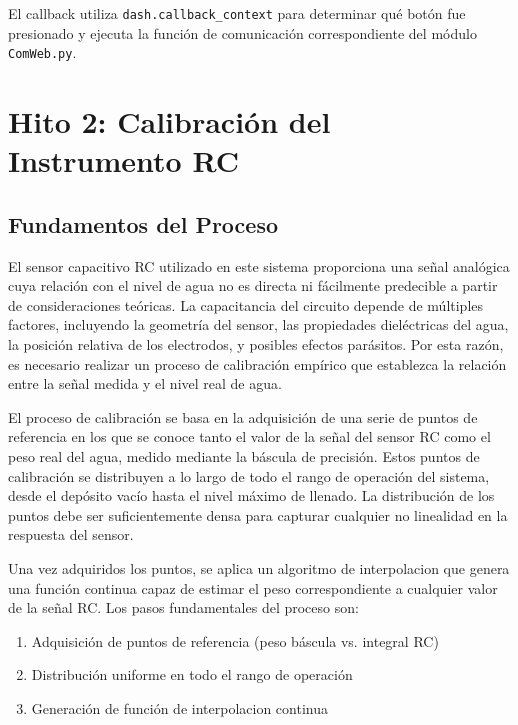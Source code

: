\documentclass[12pt,a4paper]{article}
\begin{document}
El callback utiliza \texttt{dash.callback\_context} para determinar qué botón fue presionado y ejecuta la función de comunicación correspondiente del módulo \texttt{ComWeb.py}.

\section{Hito 2: Calibración del Instrumento RC}

\subsection{Fundamentos del Proceso}

El sensor capacitivo RC utilizado en este sistema proporciona una señal analógica cuya relación con el nivel de agua no es directa ni fácilmente predecible a partir de consideraciones teóricas. La capacitancia del circuito depende de múltiples factores, incluyendo la geometría del sensor, las propiedades dieléctricas del agua, la posición relativa de los electrodos, y posibles efectos parásitos. Por esta razón, es necesario realizar un proceso de calibración empírico que establezca la relación entre la señal medida y el nivel real de agua.

El proceso de calibración se basa en la adquisición de una serie de puntos de referencia en los que se conoce tanto el valor de la señal del sensor RC como el peso real del agua, medido mediante la báscula de precisión. Estos puntos de calibración se distribuyen a lo largo de todo el rango de operación del sistema, desde el depósito vacío hasta el nivel máximo de llenado. La distribución de los puntos debe ser suficientemente densa para capturar cualquier no linealidad en la respuesta del sensor.

Una vez adquiridos los puntos, se aplica un algoritmo de interpolacion que genera una función continua capaz de estimar el peso correspondiente a cualquier valor de la señal RC. Los pasos fundamentales del proceso son:

\begin{enumerate}
    \item Adquisición de puntos de referencia (peso báscula vs. integral RC)
    \item Distribución uniforme en todo el rango de operación
    \item Generación de función de interpolacion continua
\end{enumerate}
\end{document}
